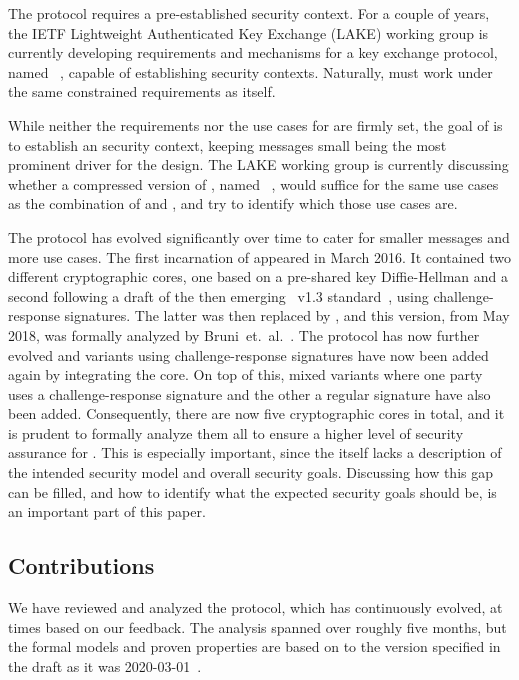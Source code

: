 \documentclass[runningheads,draft,x11names]{llncs}
\begin{document}
The \mOscore{} protocol requires a pre-established security context.
%
For a couple of years, the IETF Lightweight Authenticated Key Exchange (LAKE)
working group is currently developing requirements and mechanisms for a key
exchange protocol, named \mEdhoc~\cite{selander-lake-edhoc-01}, capable of
establishing \mOscore{} security contexts.
%
Naturally, \mEdhoc{} must work under the same constrained requirements as
\mOscore{} itself.
%

While neither the requirements nor the use cases for \mEdhoc{} are firmly set,
the goal of \mEdhoc{} is to establish an \mOscore{} security
context, keeping messages small being the most prominent driver for the
design.
%
The LAKE working group is currently discussing whether a compressed version of
\mTls, named \mCtls~\cite{ietf-tls-ctls-00}, would suffice for the same use
cases as the combination of \mOscore{} and \mEdhoc, and try to identify which
those use cases are.
%

The \mEdhoc{} protocol has evolved significantly over time to cater for smaller
messages and more use cases.
%
The first incarnation of \mEdhoc{} appeared in March 2016.
%
It contained two different cryptographic cores, one based on a
pre-shared key Diffie-Hellman and a second following a draft of the
then emerging \mTls\ v1.3 standard~\cite{ietf-tls-tls13-11}, using
challenge-response signatures.
%
The latter was then replaced by \mSigma, and this version, from May 2018, was
formally analyzed by Bruni~et.~al.~\cite{DBLP:conf/secsr/BruniJPS18}.
%
The protocol has now further evolved and variants using challenge-response
signatures have now been added again by integrating the \mOptls{} core.
%
On top of this, mixed variants where one party uses a challenge-response
signature and the other a regular signature have also been added.
%
Consequently, there are now five cryptographic cores in total, and it is prudent
to formally analyze them all to ensure a higher level of security assurance for
\mEdhoc.
%
This is especially important, since the \mSpec{} itself lacks a description
of the intended security model and overall security goals.
%
Discussing how this gap can be filled, and how to identify what the expected
security goals should be, is an important part of this paper.
%

\subsection{Contributions}
\label{sec:contributions}
We have reviewed and analyzed the \mEdhoc{} protocol, which has continuously
evolved, at times based on our feedback.
%
The analysis spanned over roughly five months, but the formal models and proven
properties are based on to the version specified in the draft as it was
2020-03-01~\cite{selander-lake-edhoc-01}.
%
\end{document}
